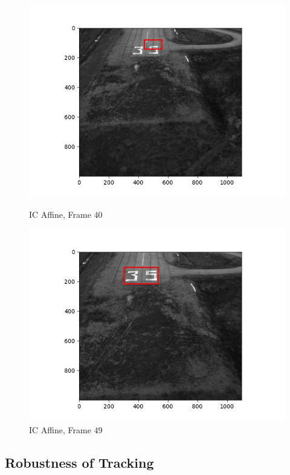 \begin{figure}[H]
\begin{minipage}{.45\textwidth}
    \includegraphics[width=\textwidth]{./figures/ic_affine/landing/frame000040.jpg}
    \caption{IC Affine, Frame $40$}
  \end{minipage}
  \begin{minipage}{.45\textwidth}
    \centering
    \includegraphics[width=\textwidth]{./figures/ic_affine/landing/frame000049.jpg}
    \caption{IC Affine, Frame $49$}
  \end{minipage}
\end{figure}

\subsection{Robustness of Tracking}

